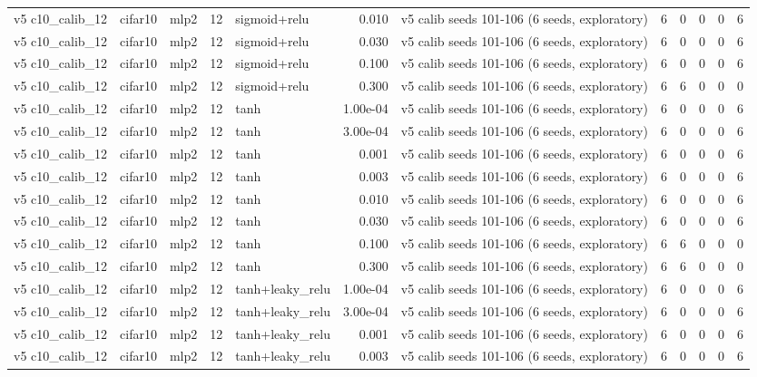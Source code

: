 \begin{table}[htbp]
{\begin{tabular}{@{}lllrlrlrrrrr@{}}
v5 c10\_calib\_12 & cifar10 & mlp2 & 12 & sigmoid+relu & 0.010 & v5 calib seeds 101-106 (6 seeds, exploratory) & 6 & 0 & 0 & 0 & 6 \\
v5 c10\_calib\_12 & cifar10 & mlp2 & 12 & sigmoid+relu & 0.030 & v5 calib seeds 101-106 (6 seeds, exploratory) & 6 & 0 & 0 & 0 & 6 \\
v5 c10\_calib\_12 & cifar10 & mlp2 & 12 & sigmoid+relu & 0.100 & v5 calib seeds 101-106 (6 seeds, exploratory) & 6 & 0 & 0 & 0 & 6 \\
v5 c10\_calib\_12 & cifar10 & mlp2 & 12 & sigmoid+relu & 0.300 & v5 calib seeds 101-106 (6 seeds, exploratory) & 6 & 6 & 0 & 0 & 0 \\
v5 c10\_calib\_12 & cifar10 & mlp2 & 12 & tanh & 1.00e-04 & v5 calib seeds 101-106 (6 seeds, exploratory) & 6 & 0 & 0 & 0 & 6 \\
v5 c10\_calib\_12 & cifar10 & mlp2 & 12 & tanh & 3.00e-04 & v5 calib seeds 101-106 (6 seeds, exploratory) & 6 & 0 & 0 & 0 & 6 \\
v5 c10\_calib\_12 & cifar10 & mlp2 & 12 & tanh & 0.001 & v5 calib seeds 101-106 (6 seeds, exploratory) & 6 & 0 & 0 & 0 & 6 \\
v5 c10\_calib\_12 & cifar10 & mlp2 & 12 & tanh & 0.003 & v5 calib seeds 101-106 (6 seeds, exploratory) & 6 & 0 & 0 & 0 & 6 \\
v5 c10\_calib\_12 & cifar10 & mlp2 & 12 & tanh & 0.010 & v5 calib seeds 101-106 (6 seeds, exploratory) & 6 & 0 & 0 & 0 & 6 \\
v5 c10\_calib\_12 & cifar10 & mlp2 & 12 & tanh & 0.030 & v5 calib seeds 101-106 (6 seeds, exploratory) & 6 & 0 & 0 & 0 & 6 \\
v5 c10\_calib\_12 & cifar10 & mlp2 & 12 & tanh & 0.100 & v5 calib seeds 101-106 (6 seeds, exploratory) & 6 & 6 & 0 & 0 & 0 \\
v5 c10\_calib\_12 & cifar10 & mlp2 & 12 & tanh & 0.300 & v5 calib seeds 101-106 (6 seeds, exploratory) & 6 & 6 & 0 & 0 & 0 \\
v5 c10\_calib\_12 & cifar10 & mlp2 & 12 & tanh+leaky\_relu & 1.00e-04 & v5 calib seeds 101-106 (6 seeds, exploratory) & 6 & 0 & 0 & 0 & 6 \\
v5 c10\_calib\_12 & cifar10 & mlp2 & 12 & tanh+leaky\_relu & 3.00e-04 & v5 calib seeds 101-106 (6 seeds, exploratory) & 6 & 0 & 0 & 0 & 6 \\
v5 c10\_calib\_12 & cifar10 & mlp2 & 12 & tanh+leaky\_relu & 0.001 & v5 calib seeds 101-106 (6 seeds, exploratory) & 6 & 0 & 0 & 0 & 6 \\
v5 c10\_calib\_12 & cifar10 & mlp2 & 12 & tanh+leaky\_relu & 0.003 & v5 calib seeds 101-106 (6 seeds, exploratory) & 6 & 0 & 0 & 0 & 6 \\

\end{tabular}}
\end{table}
